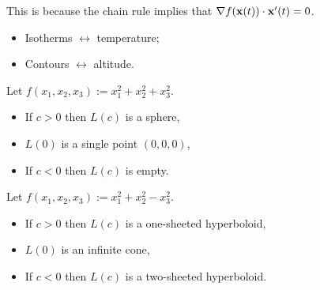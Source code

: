 This is because the chain rule implies that \(\nabla f(\mathbf{x}(t)) \cdot \mathbf{x}'(t) = 0\).


\begin{itemize}
    \item   Isotherms \(\leftrightarrow\) temperature;
    \item   Contours \(\leftrightarrow\)  altitude.
\end{itemize}

\begin{example*}
    Let \(f(x_1,x_2,x_3):=x_1^2 + x_2^2 + x_3^2\).
    \begin{itemize}
        \item If \(c>0\) then \(L(c)\) %
              is a sphere,
        \item \(L(0) \) is a single point \((0,0,0)\),
        \item If \(c<0\) then \(L(c)\) is empty.
    \end{itemize}
\end{example*}

\begin{example*}
    Let \(f(x_1,x_2,x_3):=x_1^2 + x_2^2 - x_3^2\).
    \begin{itemize}
        \item If \(c>0\) then \(L(c)\) is a one-sheeted hyperboloid,
        \item \(L(0) \) is an infinite cone,
        \item If \(c<0\) then \(L(c)\) is a two-sheeted hyperboloid.
    \end{itemize}
\end{example*}

